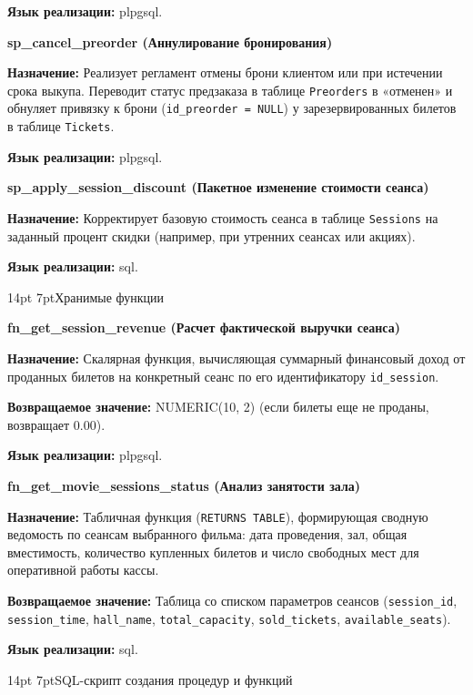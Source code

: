 \documentclass[a4paper,12pt]{article}
\makeatletter
\renewcommand{\normalsize}{\fontsize{14}{18.4}\selectfont}
\renewcommand\section{\@startsection{section}{\z@}{\z@}%
  {14pt \@plus 4pt \@minus 4pt}{7pt}{\normalsize\bfseries}}
\renewcommand\subsection{\@startsection{subsection}{\z@}{\z@}%
  {14pt \@plus 4pt \@minus 4pt}{7pt}{\normalsize\bfseries}}
\newcommand{\grouplabel}[1]{\par\medskip\noindent\textbf{#1}\par\smallskip}
\makeatother
\begin{document}
\textbf{Язык реализации:} plpgsql.

\grouplabel{sp\_cancel\_preorder (Аннулирование бронирования)}

\textbf{Назначение:} Реализует регламент отмены брони клиентом или при истечении срока выкупа. Переводит статус предзаказа в таблице \texttt{Preorders} в «отменен» и обнуляет привязку к брони (\texttt{id\_preorder = NULL}) у зарезервированных билетов в таблице \texttt{Tickets}.

\textbf{Язык реализации:} plpgsql.

\grouplabel{sp\_apply\_session\_discount (Пакетное изменение стоимости сеанса)}

\textbf{Назначение:} Корректирует базовую стоимость сеанса в таблице \texttt{Sessions} на заданный процент скидки (например, при утренних сеансах или акциях).

\textbf{Язык реализации:} sql.

\subsection{Хранимые функции}

\grouplabel{fn\_get\_session\_revenue (Расчет фактической выручки сеанса)}

\textbf{Назначение:} Скалярная функция, вычисляющая суммарный финансовый доход от проданных билетов на конкретный сеанс по его идентификатору \texttt{id\_session}.

\textbf{Возвращаемое значение:} NUMERIC(10, 2) (если билеты еще не проданы, возвращает 0.00).

\textbf{Язык реализации:} plpgsql.

\grouplabel{fn\_get\_movie\_sessions\_status (Анализ занятости зала)}

\textbf{Назначение:} Табличная функция (\texttt{RETURNS TABLE}), формирующая сводную ведомость по сеансам выбранного фильма: дата проведения, зал, общая вместимость, количество купленных билетов и число свободных мест для оперативной работы кассы.

\textbf{Возвращаемое значение:} Таблица со списком параметров сеансов (\texttt{session\_id}, \texttt{session\_time}, \texttt{hall\_name}, \texttt{total\_capacity}, \texttt{sold\_tickets}, \texttt{available\_seats}).

\textbf{Язык реализации:} sql.


\section{SQL-скрипт создания процедур и функций}
\end{document}
